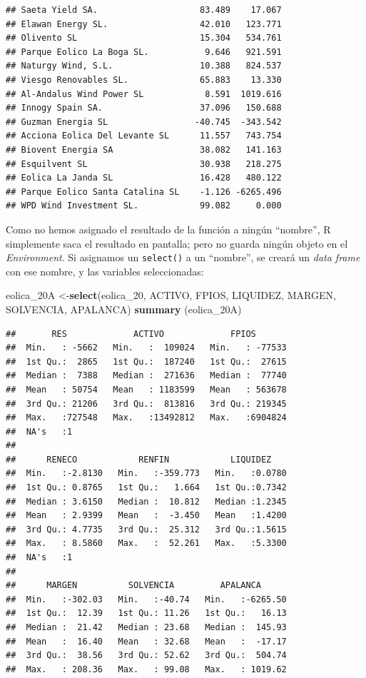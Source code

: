 \documentclass[
]{book}
\newenvironment{Shaded}{\begin{snugshade}}{\end{snugshade}}
\newcommand{\FunctionTok}[1]{\textcolor[rgb]{0.13,0.29,0.53}{\textbf{#1}}}
\newcommand{\NormalTok}[1]{#1}
\newcommand{\OtherTok}[1]{\textcolor[rgb]{0.56,0.35,0.01}{#1}}
\begin{document}
\begin{verbatim}
## Saeta Yield SA.                    83.489    17.067
## Elawan Energy SL.                  42.010   123.771
## Olivento SL                        15.304   534.761
## Parque Eolico La Boga SL.           9.646   921.591
## Naturgy Wind, S.L.                 10.388   824.537
## Viesgo Renovables SL.              65.883    13.330
## Al-Andalus Wind Power SL            8.591  1019.616
## Innogy Spain SA.                   37.096   150.688
## Guzman Energia SL                 -40.745  -343.542
## Acciona Eolica Del Levante SL      11.557   743.754
## Biovent Energia SA                 38.082   141.163
## Esquilvent SL                      30.938   218.275
## Eolica La Janda SL                 16.428   480.122
## Parque Eolico Santa Catalina SL    -1.126 -6265.496
## WPD Wind Investment SL.            99.082     0.000
\end{verbatim}

Como no hemos asignado el resultado de la función a ningún ``nombre'', R simplemente saca el resultado en pantalla; pero no guarda ningún objeto en el \emph{Environment}. Si asignamos un \texttt{select()} a un ``nombre'', se creará un \emph{data frame} con ese nombre, y las variables seleccionadas:

\begin{Shaded}
\begin{Highlighting}[]
\NormalTok{eolica\_20A }\OtherTok{\textless{}{-}}\FunctionTok{select}\NormalTok{(eolica\_20, ACTIVO, FPIOS, LIQUIDEZ, MARGEN, SOLVENCIA, APALANCA)}
\FunctionTok{summary}\NormalTok{ (eolica\_20A)}
\end{Highlighting}
\end{Shaded}

\begin{verbatim}
##       RES             ACTIVO             FPIOS        
##  Min.   : -5662   Min.   :  109024   Min.   : -77533  
##  1st Qu.:  2865   1st Qu.:  187240   1st Qu.:  27615  
##  Median :  7388   Median :  271636   Median :  77740  
##  Mean   : 50754   Mean   : 1183599   Mean   : 563678  
##  3rd Qu.: 21206   3rd Qu.:  813816   3rd Qu.: 219345  
##  Max.   :727548   Max.   :13492812   Max.   :6904824  
##  NA's   :1                                            
## 
##      RENECO            RENFIN            LIQUIDEZ     
##  Min.   :-2.8130   Min.   :-359.773   Min.   :0.0780  
##  1st Qu.: 0.8765   1st Qu.:   1.664   1st Qu.:0.7342  
##  Median : 3.6150   Median :  10.812   Median :1.2345  
##  Mean   : 2.9399   Mean   :  -3.450   Mean   :1.4200  
##  3rd Qu.: 4.7735   3rd Qu.:  25.312   3rd Qu.:1.5615  
##  Max.   : 8.5860   Max.   :  52.261   Max.   :5.3300  
##  NA's   :1                                            
## 
##      MARGEN          SOLVENCIA         APALANCA       
##  Min.   :-302.03   Min.   :-40.74   Min.   :-6265.50  
##  1st Qu.:  12.39   1st Qu.: 11.26   1st Qu.:   16.13  
##  Median :  21.42   Median : 23.68   Median :  145.93  
##  Mean   :  16.40   Mean   : 32.68   Mean   :  -17.17  
##  3rd Qu.:  38.56   3rd Qu.: 52.62   3rd Qu.:  504.74  
##  Max.   : 208.36   Max.   : 99.08   Max.   : 1019.62
\end{verbatim}
\end{document}
